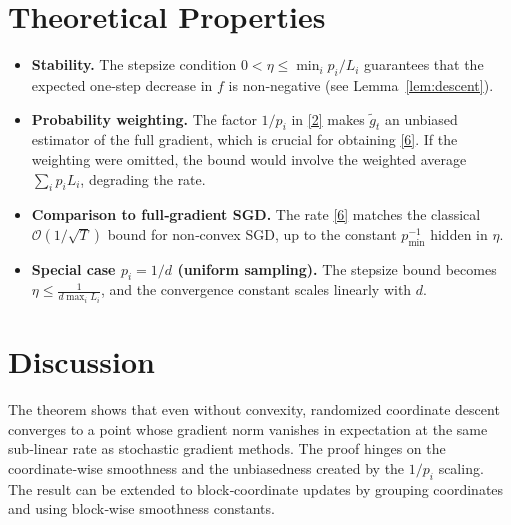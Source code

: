 \documentclass{article}
\begin{document}
\section*{Theoretical Properties}
\begin{itemize}
\item \textbf{Stability.} The stepsize condition $0<\eta\le\min_i p_i/L_i$ guarantees that the expected one‑step decrease in $f$ is non‑negative (see Lemma~\ref{lem:descent}).
\item \textbf{Probability weighting.} The factor $1/p_i$ in \eqref{2} makes $\tilde g_t$ an unbiased estimator of the full gradient, which is crucial for obtaining \eqref{6}. If the weighting were omitted, the bound would involve the weighted average $\sum_i p_i L_i$, degrading the rate.
\item \textbf{Comparison to full‑gradient SGD.} The rate \eqref{6} matches the classical $\mathcal{O}(1/\sqrt{T})$ bound for non‑convex SGD, up to the constant $p_{\min}^{-1}$ hidden in $\eta$.
\item \textbf{Special case $p_i=1/d$ (uniform sampling).} The stepsize bound becomes $\eta\le \frac{1}{d\max_i L_i}$, and the convergence constant scales linearly with $d$.
\end{itemize}

\section*{Discussion}
The theorem shows that even without convexity, randomized coordinate descent converges to a point whose gradient norm vanishes in expectation at the same sub‑linear rate as stochastic gradient methods. The proof hinges on the coordinate‑wise smoothness and the unbiasedness created by the $1/p_i$ scaling. The result can be extended to block‑coordinate updates by grouping coordinates and using block‑wise smoothness constants.

\newpage
\end{document}
